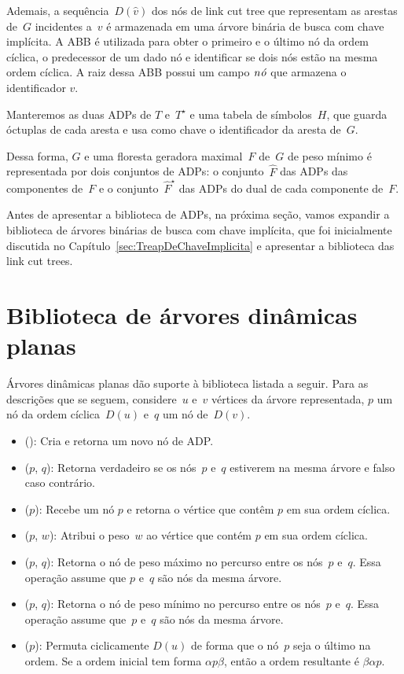 Ademais, a sequência~$D(\hat v)$ dos nós de link cut tree que representam as arestas de~$G$ incidentes a~$v$ é armazenada em uma árvore binária de busca com chave implícita.
A ABB é utilizada para obter o primeiro e o último nó da ordem cíclica, o predecessor de um dado nó e identificar se dois nós estão na mesma ordem cíclica.
A raiz dessa ABB possui um campo $\mathit{n\acute{o}}$ que armazena o identificador $v$.

Manteremos as duas ADPs de $T$ e~$T^\star$ e uma tabela de símbolos~$H$, que guarda óctuplas de cada aresta e usa como chave o identificador da aresta de~$G$.


Dessa forma, $G$ e uma floresta geradora maximal~$F$ de~$G$ de peso mínimo é representada por dois conjuntos de ADPs: o conjunto~$\hat F$ das ADPs das componentes de~$F$ e o conjunto~$\hat F^\star$ das ADPs do dual de cada componente de~$F$.

Antes de apresentar a biblioteca de ADPs, na próxima seção, vamos expandir a biblioteca de árvores binárias de busca com chave implícita, que foi inicialmente discutida no Capítulo~\ref{sec:TreapDeChaveImplicita} e apresentar a biblioteca das link cut trees.


\section{Biblioteca de árvores dinâmicas planas}
\label{sec:EODT}

Árvores dinâmicas planas dão suporte à biblioteca listada a seguir.
Para as descrições que se seguem, considere~$u$ e~$v$ vértices da árvore representada,
$p$ um nó da ordem cíclica~$D(u)$ e~$q$ um nó de~$D(v)$.

\begin{itemize}
\item \LCOMakeNode(): Cria e retorna um novo nó de ADP.
\item \LCOConnected($p$, $q$): Retorna verdadeiro se os nós~$p$ e~$q$ estiverem na mesma árvore e falso caso contrário.
\item \LCOFindNode($p$): Recebe um nó $p$ e retorna o vértice que contêm $p$ em sua ordem cíclica.
\item \LCOAddCost($p$, $w$): Atribui o peso~$w$ ao vértice que contém $p$ em sua ordem cíclica.
\item \LCOMax($p$, $q$): Retorna o nó de peso máximo no percurso entre os nós~$p$ e~$q$.
Essa operação assume que $p$ e~$q$ são nós da mesma árvore.
\item \LCOMin($p$, $q$): Retorna o nó de peso mínimo no percurso entre os nós~$p$ e~$q$.
Essa operação assume que~$p$ e~$q$ são nós da mesma árvore.
\item \LCOCycle($p$): Permuta ciclicamente $D(u)$ de forma que o nó~$p$ seja o último na ordem.
Se a ordem inicial tem forma $\alpha p \beta$, então a ordem resultante é $\beta\alpha p$.
\end{itemize}

